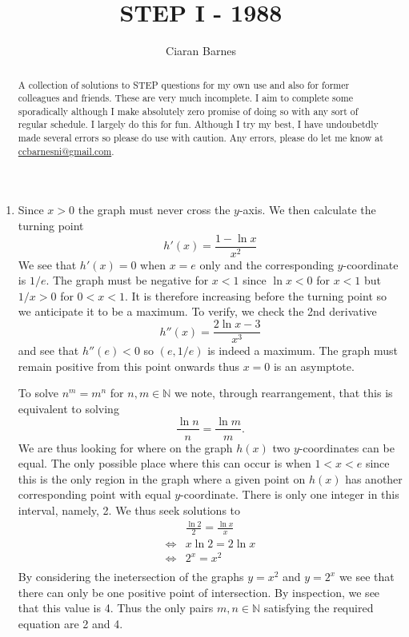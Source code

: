 \documentclass{article}
\title{STEP I - 1988}
\author{Ciaran Barnes}
\begin{document}
\maketitle

\begin{abstract}
	A collection of solutions to STEP questions for my own use and also for former colleagues and friends. These are very much incomplete. I aim to complete some sporadically although I make absolutely zero promise of doing so with any sort of regular schedule. I largely do this for fun. Although I try my best, I have undoubetdly made several errors so please do use with caution. Any errors, please do let me know at \url{ccbarnesni@gmail.com}.
\end{abstract}

\newpage

\begin{enumerate}
    \item Since \(x>0\) the graph must never cross the \(y\)-axis. We then calculate the turning point
    \[
    h'(x) = \frac{1-\ln x}{x^2}
    \]
    We see that \(h'(x)=0\) when \(x=e\) only and the corresponding \(y\)-coordinate is \(1/e\). The graph must be negative for \(x<1\) since \(\ln x <0\) for \(x<1\) but \(1/x>0\) for \(0<x<1\). It is therefore increasing before the turning point so we anticipate it to be a maximum. To verify, we check the 2nd derivative
    \[
    h''(x) = \frac{2\ln x -3}{x^3}
    \]
    and see that \(h''(e)<0\) so \((e,1/e)\) is indeed a maximum. The graph must remain positive from this point onwards thus \(x=0\) is an asymptote.

    To solve \(n^m=m^n\) for \(n,m \in \mathbb{N}\) we note, through rearrangement, that this is equivalent to solving
    \[
    \frac{\ln n}{n} = \frac{\ln m}{m}.
    \]
    We are thus looking for where on the graph \(h(x)\) two \(y\)-coordinates can be equal. The only possible place where this can occur is when \(1<x<e\) since this is the only region in the graph where a given point on \(h(x)\) has another corresponding point with equal \(y\)-coordinate. There is only one integer in this interval, namely, 2. We thus seek solutions to
    \begin{align*}
        &\frac{\ln 2}{2} = \frac{\ln x}{x} \\
        \iff &x\ln2 = 2\ln x \\
        \iff &2^x = x^2 \\
    \end{align*}
    By considering the inetersection of the graphs \(y=x^2\) and \(y=2^x\) we see that there can only be one positive point of intersection. By inspection, we see that this value is 4. Thus the only pairs \(m, n \in \mathbb{N}\) satisfying the required equation are 2 and 4.
    

\end{enumerate}
\end{document}
